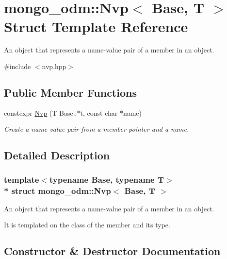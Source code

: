 \hypertarget{structmongo__odm_1_1Nvp}{}\section{mongo\+\_\+odm\+:\+:Nvp$<$ Base, T $>$ Struct Template Reference}
\label{structmongo__odm_1_1Nvp}


An object that represents a name-\/value pair of a member in an object.  




{\ttfamily \#include $<$nvp.\+hpp$>$}

\subsection*{Public Member Functions}
\begin{DoxyCompactItemize}
\item 
constexpr \hyperlink{structmongo__odm_1_1Nvp_a0892863bcb5093550a0f3bfad3a16580}{Nvp} (T Base\+::$\ast$t, const char $\ast$name)
\begin{DoxyCompactList}\small\item\em Create a name-\/value pair from a member pointer and a name. \end{DoxyCompactList}\end{DoxyCompactItemize}


\subsection{Detailed Description}
\subsubsection*{template$<$typename Base, typename T$>$\\*
struct mongo\+\_\+odm\+::\+Nvp$<$ Base, T $>$}

An object that represents a name-\/value pair of a member in an object. 

It is templated on the class of the member and its type. 

\subsection{Constructor \& Destructor Documentation}
